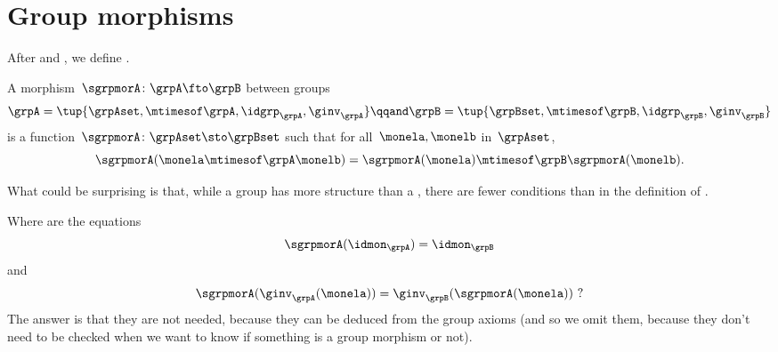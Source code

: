 \section{Group morphisms}

After  and , we define .


\begin{ctdefinition}
    \label{def:group-mor}
    A morphism~$\sgrpmorA\colon \grpA \fto \grpB$ between groups
    \begin{equation}
        \grpA = \tup{\grpAset, {{\mtimesof\grpA}}, \idgrp_\grpA, \ginv_\grpA}
        \qqand
        \grpB = \tup{\grpBset, {{\mtimesof\grpB}}, \idgrp_\grpB, \ginv_\grpB}
    \end{equation}
    is a function~$\sgrpmorA \colon \grpAset \sto \grpBset$ such that for all~$\monela, \monelb$ in~$\grpAset$,
    \begin{equation}
        \label{eq:group-mor-comp}
        \sgrpmorA (\monela \mtimesof\grpA \monelb) = \sgrpmorA (\monela) \mtimesof\grpB \sgrpmorA(\monelb).
    \end{equation}
\end{ctdefinition}

What could be surprising is that, while a group has more structure than a , there are fewer conditions than in the definition of .

Where are the equations
\begin{equation}
    \label{eq:grp-id-comp}
    \sgrpmorA (\idmon_\grpA) = \idmon_{\grpB}
\end{equation}
and
\begin{equation}
    \label{eq:grp-inv-comp}
    \sgrpmorA (\ginv_\grpA(\monela)) = \ginv_\grpB(\sgrpmorA(\monela)) \ ?
\end{equation}
%
The answer is that they are not needed, because they can be deduced from the group axioms (and so we omit them, because they don't need to be checked when we want to know if something is a group morphism or not).

